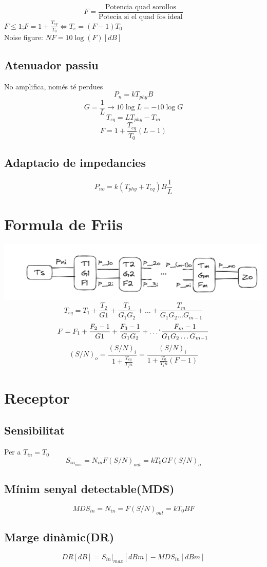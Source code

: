 \documentclass{article}
\begin{document}
\begin{multicols*}{2}
	$$F=\frac{\text{Potencia quad sorollos}}{\text{Potecia si el quad fos ideal}}$$
	$F\leq1$;$F=1+\frac{T_{eq}}{T_0}\Leftrightarrow T_e=(F-1)T_0$\\
	Noise figure: $NF=10\log(F)[dB]$
	\subsection{Atenuador passiu}
	No amplifica, només té perdues
	$$P_n=kT_{phy}B$$
	$$G=\frac{1}{L}\rightarrow 10\log L=-10\log G$$
	$$T_{eq}=LT_{phy}-T_{in}$$
	$$F= 1+\frac{T_{eq}}{T_0}(L-1)$$
	\subsection{Adaptacio de impedancies}
	$$P_{no}=k(T_{phy}+T_{eq})B\frac{1}{L} $$
	\section{Formula de Friis}
	\includegraphics[width=1\linewidth]{quadcascada.png}
	$$T_{eq}=T_1+\frac{T_2}{G1}+\frac{T_3}{G_1 G_2}+\dots+\frac{T_m}{G_1 G_2\dots G_{m-1}}$$
	$$F=F_1+\frac{F_2-1}{G1}+\frac{F_3-1}{G_1 G_2}+\dots`\frac{F_m-1}{G_1 G_2\dots G_{m-1}}$$
	$$(S/N)_o=\frac{(S/N)_i}{1+\frac{T_{eq}}{T_in}}=\frac{(S/N)_i}{1+\frac{T_0}{T_in}(F-1)}$$

	\section{Receptor}
	\subsection{Sensibilitat}
	Per a $T_{in}=T_0$
	$$S_{in_{min}}=N_{in}F(S/N)_{out}=kT_0GF(S/N)_{o}$$
	\subsection{Mínim senyal detectable(MDS)}
	$$MDS_{in}=N_{in}=F(S/N)_{out}=kT_0BF$$
	\subsection{Marge dinàmic(DR)}
	$$DR[dB]=S_{in}|_{max}[dBm]-MDS_{in}[dBm]$$


\end{multicols*}
\end{document}
